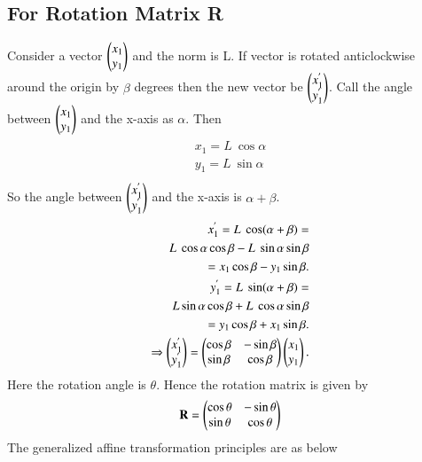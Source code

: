\documentclass[journal,12pt,twocolumn]{IEEEtran}
\begin{document}
\subsection{For Rotation Matrix R}
Consider a vector $\begin{pmatrix}x_1\\y_1\end{pmatrix}$ and the norm is L.
If vector is rotated anticlockwise around the origin by $\beta$ degrees then the new vector be $\begin{pmatrix}x_1^{'}\\y_1^{'}\end{pmatrix}$. Call the angle between  $\begin{pmatrix}x_1\\y_1\end{pmatrix}$ and the x-axis as $\alpha$. Then
\begin{align}
\begin{split}
x_1= L\ \cos \alpha\\
y_1= L\ \sin \alpha\\
\end{split}
\end{align}
So the angle between $\begin{pmatrix}x_1^{'}\\y_1^{'}\end{pmatrix}$ and the x-axis is $\alpha+\beta$.
\begin{align}
\begin{split}
x_1^{'}= L\ \cos (\alpha+\beta)=\\
L\ \cos \alpha \cos \beta-L\ \sin \alpha \sin \beta\\
=x_1\cos \beta-y_1\sin \beta.\\
y_1^{'}= L\ \sin (\alpha+\beta)=\\
L\sin \alpha \cos \beta+L\ \cos \alpha \sin \beta\\
=y_1\cos \beta+x_1\sin \beta.\\
\Rightarrow \begin{pmatrix}x_1^{'}\\y_1^{'}\end{pmatrix}=\begin{pmatrix}\cos \beta & -\sin \beta\\\sin \beta & \cos \beta\end{pmatrix}\begin{pmatrix}x_1\\y_1\end{pmatrix}.\\
\end{split}
\end{align}
Here the rotation angle is $\theta$. Hence the rotation matrix is given by
\begin{align}
\begin{split}
\mathbf{R}=\begin{pmatrix}\cos \theta & -\sin \theta\\\sin \theta & \cos \theta\end{pmatrix}\\ 
\end{split}
\end{align}
The generalized affine transformation principles are as below
\end{document}
